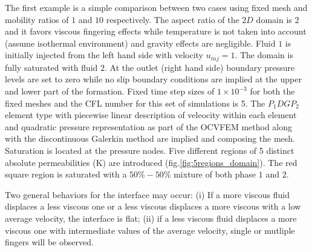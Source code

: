 \documentclass[preprint,authoryear,12pt]{elsarticle}
\begin{document}
The first example is a simple comparison between two cases using fixed mesh and mobility ratios of $1$ and $10$ respectively. The aspect ratio of the $2D$ domain is 2 and it favors viscous fingering effects while temperature is not taken into account (assume isothermal environment) and gravity effects are negligible. Fluid $1$ is initially injected from the left hand side with velocity $u_{inj}=1$. The domain is fully saturated with fluid $2$. At the outlet (right hand side) boundary pressure levels are set to zero while no slip boundary conditions are implied at the upper and lower part of the formation. Fixed time step sizes of $1 \times 10^{-3}$ for both the fixed meshes and the CFL number for this set of simulations is 5. The $P_{1}DGP_{2}$ element type with piecewise linear description of veleocity within each element and quadratic pressure representation as part of the OCVFEM method along with the discontinuous Galerkin method are implied and composing the mesh. Saturation is located at the pressure nodes. Five different regions of 5 distinct absolute permeabilities (K) are introduced (fig.\ref{fig:5regions_domain}). The red square region is saturated with a $50\%-50\%$ mixture of both phase $1$ and $2$. 

Two general behaviors for the interface may occur: (i) If a more viscous fluid displaces a less viscous one or a less viscous displaces a more viscous with a low average velocity, the interface is flat; (ii) if a less viscous fluid displaces a more viscous one with intermediate values of the average velocity, single or mutliple fingers will be observed.
\end{document}
